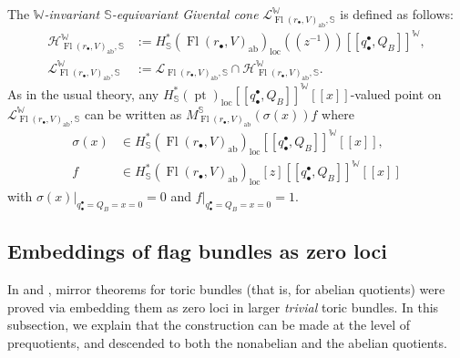 \documentclass[a4paper,12pt]{amsart}
\numberwithin{equation}{section}
\theoremstyle{definition}
\newcommand{\bbS}{\mathbb{S}}
\newcommand{\W}{\mathbb{W}}
\newcommand{\cH}{\mathcal{H}}
\newcommand{\cL}{\mathcal{L}}
\newcommand{\loc}{{\operatorname{loc}}}
\newcommand{\pt}{\operatorname{pt}}
\newcommand{\Fl}{\operatorname{Fl}}
\begin{document}
The \emph{$\W$-invariant $\bbS$-equivariant Givental cone} $\cL^\W_{\Fl(r_\bullet,V)_{\operatorname{ab}},\bbS}$ is defined as follows:
\begin{align*}
    \cH_{\Fl(r_\bullet,V)_{\operatorname{ab}},\bbS}^\W&:=H^*_\bbS(\Fl(r_\bullet,V)_{\operatorname{ab}})_\loc(\!(z^{-1})\!)[\![q_\bullet^\bullet,Q_B]\!]^\W, \\
    \cL_{\Fl(r_\bullet,V)_{\operatorname{ab}},\bbS}^\W &:= \cL_{\Fl(r_\bullet,V)_{\operatorname{ab}},\bbS} \cap \cH_{\Fl(r_\bullet,V)_{\operatorname{ab}},\bbS}^\W.
\end{align*}
As in the usual theory, any $H^*_\bbS(\pt)_\loc[\![q_\bullet^\bullet,Q_B]\!]^\W[\![x]\!]$-valued point on $\cL_{\Fl(r_\bullet,V)_{\operatorname{ab}},\bbS}^\W$ can be written as $M_{\Fl(r_\bullet,V)_{\operatorname{ab}}}^\bbS(\sigma(x))f$ where
\begin{align*}
    \sigma(x)&\in H^*_\bbS(\Fl(r_\bullet,V)_{\operatorname{ab}})_\loc[\![q^\bullet_\bullet,Q_B]\!]^\W[\![x]\!],  \\
    f&\in H^*_\bbS(\Fl(r_\bullet,V)_{\operatorname{ab}})_\loc[z][\![q^\bullet_\bullet,Q_B]\!]^\W[\![x]\!]
\end{align*}
with $\sigma(x)|_{q^\bullet_\bullet=Q_B=x=0}=0$ and $f|_{q^\bullet_\bullet=Q_B=x=0}=1$.

\subsection{Embeddings of flag bundles as zero loci}\label{subsection:embeddings}
In \cite{IK:quantum} and \cite{Koto:mirror}, mirror theorems for toric bundles (that is, for abelian quotients) were proved via embedding them as zero loci in larger {\em trivial} toric bundles. In this subsection, we explain that the construction can be made at the level of prequotients, and descended to both the nonabelian and the abelian quotients. 
\end{document}
